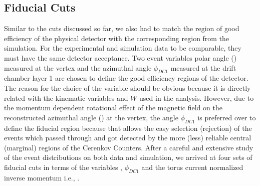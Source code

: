 \subsection{Fiducial Cuts}
\label{fidCuts}

Similar to the cuts discussed so far, we also had to match the region of good efficiency of the physical detector with the corresponding region from the simulation. For the experimental and simulation data to be comparable, they must have the same detector acceptance. %
Two event variables polar angle (\thvtx) measured at the vertex and the azimuthal angle $\phi_{DC1}$ measured at the drift chamber layer 1 are chosen to define the good efficiency regions of the detector. The reason for the choice of the variable \thvtx should be obvious because it is directly related with the kinematic variables \qsqs and $W$ used in the analysis. However, due to the momentum dependent rotational effect of the magnetic field on the reconstructed azimuthal angle (\phvtx) at the vertex, the angle $\phi_{DC1}$ is preferred over \phvtx to define the fiducial region because that allows the easy selection (rejection) of the events which passed through and got detected by the more (less) reliable central (marginal) regions of the Cerenkov Counters. %
After a careful and extensive study of the event distributions on both data and simulation, we arrived at four sets of fiducial cuts in terms of the variables \thvtx, $\phi_{DC1}$ and the torus current normalized inverse momentum i.e., \invP.%

